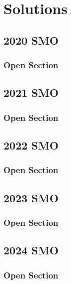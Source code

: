 \documentclass[a4paper, listof=totoc,bibliography=totoc,]{scrbook}
\begin{document}
\part{Solutions}

\chapter{2020 SMO}
\section{Open Section}


\chapter{2021 SMO}
\section{Open Section}


\chapter{2022 SMO}
\section{Open Section}



\chapter{2023 SMO}
\section{Open Section}



\chapter{2024 SMO}
\section{Open Section}


\end{document}

